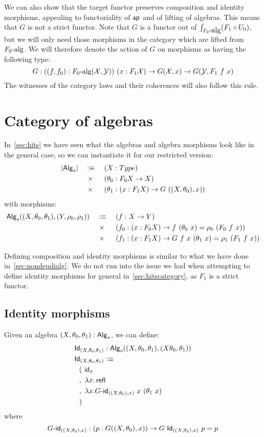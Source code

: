 \documentclass[a4paper,10pt]{report}
\begin{document}
We can also show that the target functor preserves composition and
identity morphisms, appealing to functoriality of $\mathsf{ap}$ and of lifting
of algebras. This means that $G$ is not a strict functor. Note that
$G$ is a functor out of $\int_{F_0\mbox{-alg}} (F_1 \circ U_0)$, but we
will only need those morphisms in the category which are lifted from
$F_0\mbox{-alg}$. We will therefore denote the action of $G$ on
morphisms as having the following type:
$$
G : ((f,f_0) : F_0\mbox{-alg}(\mathcal{X},\mathcal{Y}))\ (x : F_1 \mathcal{X}) \to G (\mathcal{X},x) \to G (\mathcal{Y},F_1\ f\ x)
$$
The witnesses of the category laws and their coherences will also
follow this rule.

\section{Category of algebras}

In~\cref{sec:hits} we have seen what the algebras and algebra
morphisms look like in the general case, so we can instantiate it for
our restricted version:
%
\begin{alignat*}{3}
&|\Alg_s| &&\ddefeq &&\ (X : Type) \\
&&&\ \times &&\ (\theta_0 : F_0 X \to X) \\
&&&\ \times &&\ (\theta_1 : (x : F_1 X) \to G\ ((X,\theta_0),x))
\end{alignat*}
%
with morphisms:
\begin{alignat*}{3}
  &\Alg_s((X,\theta_0,\theta_1),(Y,\rho_0,\rho_1)) &&\ddefeq &&\ (f : X \to Y) \\
  &&&\ \times &&\ (f_0 : (x : F_0 X) \to f\ (\theta_0\ x) = \rho_0\ (F_0\ f\ x)) \\
  &&&\ \times &&\ (f_1 : (x : F_1 X) \to G\ f\ x\ (\theta_1\ x) = \rho_1\ (F_1\ f\ x))
\end{alignat*}

Defining composition and identity morphisms is similar to what we have
done in~\cref{sec:nondepdialg}. We do not run into the issue we had
when attempting to define identity morphisms for general \hits
in~\cref{sec:hitscategory}, as $F_1$ is a strict functor.

\subsection{Identity morphisms}

Given an algebra $(X,\theta_0,\theta_1) : \mathsf{Alg}_s$, we can define:
%
\begin{align*}
&\mathsf{Id}_{(X,\theta_0,\theta_1)} : \mathsf{Alg}_s((X,\theta_0,\theta_1),(X\theta_0,\theta_1)) \\
&\mathsf{Id}_{(X,\theta_0,\theta_1)} :\equiv \\
&\ \ (\ \mathsf{id}_{x} \\
&\ \ ,\ \lambda x . \operatorname{\mathsf{refl}} \\
&\ \ ,\ \lambda x . G\mbox{-}\mathsf{id}_{((X,\theta_0),x)}\ x\ (\theta_1\ x) \\
&\ \ )
\end{align*}
%
where
$$
G\mbox{-}\mathsf{id}_{((X,\theta_0),x)} : (p : G ((X,\theta_0),x)) \to G\ \mathsf{Id}_{((X,\theta_0),x)}\ p = p
$$
\end{document}
